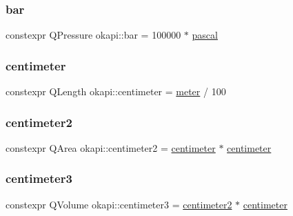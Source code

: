 \mbox{\label{namespaceokapi_a0b54d28853182078db748ab94cb8cd45}} 
\subsubsection{\texorpdfstring{bar}{bar}}
{\footnotesize\ttfamily constexpr Q\+Pressure okapi\+::bar = 100000 $\ast$ \mbox{\hyperlink{namespaceokapi_accda0a1a99e1aafa43e8ef14201374ad}{pascal}}}

\mbox{\label{namespaceokapi_a889129a4ecb3e93c695c8eea53b96602}} 
\subsubsection{\texorpdfstring{centimeter}{centimeter}}
{\footnotesize\ttfamily constexpr Q\+Length okapi\+::centimeter = \mbox{\hyperlink{namespaceokapi_a59563b3d4b18633f1c8d852e2932d1db}{meter}} / 100}

\mbox{\label{namespaceokapi_a9395c9d47680dc1bef1f41744f1a3a9c}} 
\subsubsection{\texorpdfstring{centimeter2}{centimeter2}}
{\footnotesize\ttfamily constexpr Q\+Area okapi\+::centimeter2 = \mbox{\hyperlink{namespaceokapi_a889129a4ecb3e93c695c8eea53b96602}{centimeter}} $\ast$ \mbox{\hyperlink{namespaceokapi_a889129a4ecb3e93c695c8eea53b96602}{centimeter}}}

\mbox{\label{namespaceokapi_a2a86923c7b72c51af38c1e3771fd024c}} 
\subsubsection{\texorpdfstring{centimeter3}{centimeter3}}
{\footnotesize\ttfamily constexpr Q\+Volume okapi\+::centimeter3 = \mbox{\hyperlink{namespaceokapi_a9395c9d47680dc1bef1f41744f1a3a9c}{centimeter2}} $\ast$ \mbox{\hyperlink{namespaceokapi_a889129a4ecb3e93c695c8eea53b96602}{centimeter}}}

